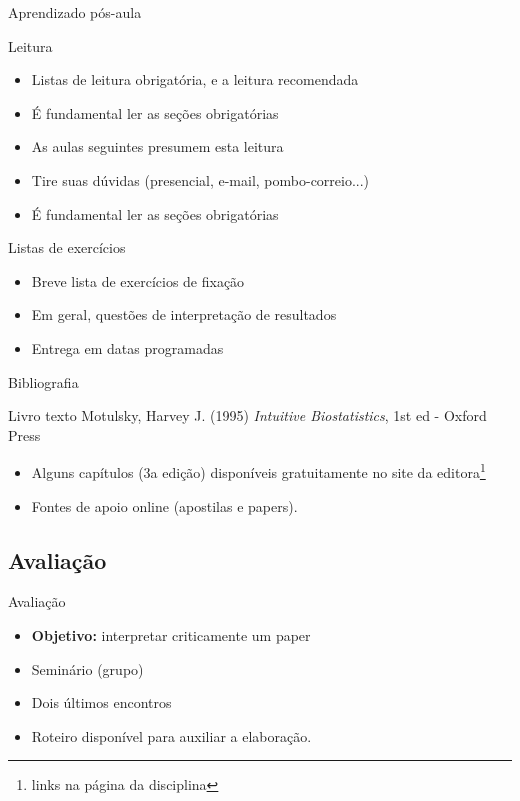 \documentclass{beamer}
\begin{document}
\begin{frame}{Aprendizado pós-aula}
  \begin{block}{Leitura}
    \begin{itemize}
    \item Listas de leitura obrigatória, e a leitura recomendada
    \item É fundamental ler as seções obrigatórias
    \item As aulas seguintes presumem esta leitura
    \item Tire suas dúvidas ({\small presencial, e-mail, pombo-correio...})
    \item É fundamental ler as seções obrigatórias
    \end{itemize}
  \end{block}
  \begin{block}{Listas de exercícios}
    \begin{itemize}
    \item Breve lista de exercícios de fixação
    \item Em geral, questões de interpretação de resultados
    \item Entrega em datas programadas
    \end{itemize}
  \end{block}
\end{frame}

\begin{frame}{Bibliografia}
  \begin{block}{Livro texto}
    Motulsky, Harvey J. (1995) {\em Intuitive Biostatistics}, 1st ed - Oxford Press
  \end{block}
  \begin{itemize}
  \item Alguns capítulos (3a edição) disponíveis gratuitamente no site da editora\footnote{links na página da disciplina}
  \item Fontes de apoio online (apostilas e papers).
  \end{itemize}
\end{frame}

\subsection{Avaliação}

\begin{frame}{Avaliação}
  \begin{itemize}
  \item {\bf Objetivo:} interpretar criticamente um paper
  \item Seminário (grupo)
  \item Dois últimos encontros
  \item Roteiro disponível para auxiliar a elaboração.
  \end{itemize}
\end{frame}
\end{document}
